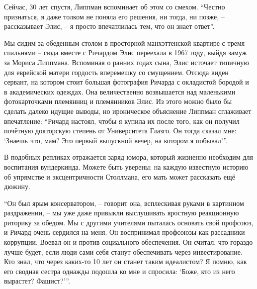 Сейчас, 30 лет спустя, Липпман вспоминает об этом со смехом. \enquote{Честно признаться, я даже толком не поняла его решения, ни тогда, ни позже, -- рассказывает Элис, -- я просто впечатлилась тем, что он знает ответ}.

Мы сидим за обеденным столом в просторной манхэттенской квартире с тремя спальнями -- сюда вместе с Ричардом Элис переехала в 1967 году, выйдя замуж за Мориса Липпмана. Вспоминая о ранних годах сына, Элис источает типичную для еврейской матери гордость вперемешку со смущением. Отсюда виден сервант, на котором стоит большая фотография Ричарда с окладистой бородой и в академических одеждах. Она величественно возвышается над маленькими фотокарточками племянниц и племянников Элис. Из этого можно было бы сделать далеко идущие выводы, но ироническое объяснение Липпман сглаживает впечатление: \enquote{Ричард настоял, чтобы я купила их после того, как он получил почётную докторскую степень от Университета Глазго. Он тогда сказал мне: \enquote{Знаешь что, мам? Это первый выпускной вечер, на котором я побывал}\hspace{0.01in}}.

В подобных репликах отражается заряд юмора, который жизненно необходим для воспитания вундеркинда. Можете быть уверены: на каждую известную историю об упрямстве и эксцентричности Столлмана, его мать может рассказать ещё дюжину.

\enquote{Он был ярым консерватором, -- говорит она, всплескивая руками в картинном раздражении, -- мы уже даже привыкли выслушивать яростную реакционную риторику за обедом. Мы с другими учителями пыталась основать свой профсоюз, и Ричард очень сердился на меня. Он воспринимал профсоюзы как рассадники коррупции. Воевал он и против социального обеспечения. Он считал, что гораздо лучше будет, если люди сами себя станут обеспечивать через инвестирование. Кто знал, что через каких-то 10 лет он станет таким идеалистом? Я помню, как его сводная сестра однажды подошла ко мне и спросила: \enquote{Боже, кто из него вырастет? Фашист?}\hspace{0.01in}}.

